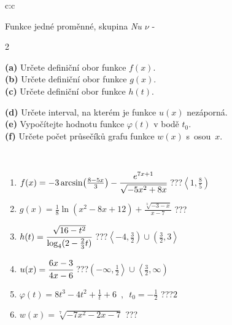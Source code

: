 \documentclass[10pt]{report}
\begin{document}
\begin{tabular}{c:c}
\begin{minipage}[c][104.5mm][t]{0.5\linewidth}
\begin{center}
\vspace{7mm}
{\huge Funkce jedné proměnné, skupina \textit{Nu $\nu$} -}\\[5mm]
\begin{minipage}{0.95\linewidth}
\begin{center}
{\small \begin{multicols}{2} \raggedright
\textbf{(a)} Určete definiční obor funkce \(f(x)\). \\[1mm]
\textbf{(b)} Určete definiční obor funkce \(g(x)\). \\[1mm]
\textbf{(c)} Určete definiční obor funkce \(h(t)\). \par \columnbreak
\textbf{(d)} Určete interval, na kterém je funkce \(u(x)\) nezáporná. \\[1mm]
\textbf{(e)} Vypočítejte hodnotu funkce \(\varphi(t)\) v bodě \(t_0\). \\[1mm]
\textbf{(f)} Určete počet průsečíků grafu funkce \(w(x)\) s~osou~\(x\). \\[1mm]
\end{multicols}
}
\end{center}
\end{minipage}
\\[4mm]
\begin{minipage}{0.79\linewidth}
\begin{center}
\begin{varwidth}{\linewidth}
\begin{enumerate}
\small
\item $f(x) = -3\arcsin\!\left( \frac{8-5x}{3} \right) - \cfrac{e^{7x+1}}{\sqrt{-5x^2+8x}}$\quad \dotfill\; ???\;\dotfill \quad $\left\langle1 , \frac{8}{5}\right)$
\item $g(x) = \frac{1}{8} \ln{\!(x^2-8x+12)}+\frac{\sqrt[3]{-3-x}}{x-7}$\quad \dotfill\; ???\;\dotfill {}
\item $h(t) = \cfrac{\sqrt{16-t^2}}{\log_4(2-\frac{2}{3}t)}$\quad \dotfill\; ???\;\dotfill \quad $\left\langle-4 , \frac{3}{2}\right)\cup\left(\frac{3}{2} , 3\right\rangle$
\item $u(x) = \cfrac{6x-3}{4x-6}$\quad \dotfill\; ???\;\dotfill \quad $\left(-\infty , \frac{1}{2}\right\rangle\cup\left\langle\frac{3}{2} , \infty\right)$
\item $\varphi(t) = 8t^3-4t^2+\frac{1}{t}+6 \enspace , \enspace t_0=-\frac{1}{2}$\quad \dotfill\; ???\;\dotfill \quad $2$
\item $w(x) = \sqrt[7]{-7x^2-2x-7}$\quad \dotfill\; ???\;\dotfill {}

\end{enumerate}
\end{varwidth}
\end{center}
\end{minipage}
\end{center}
\end{minipage}
\end{tabular}
\end{document}
